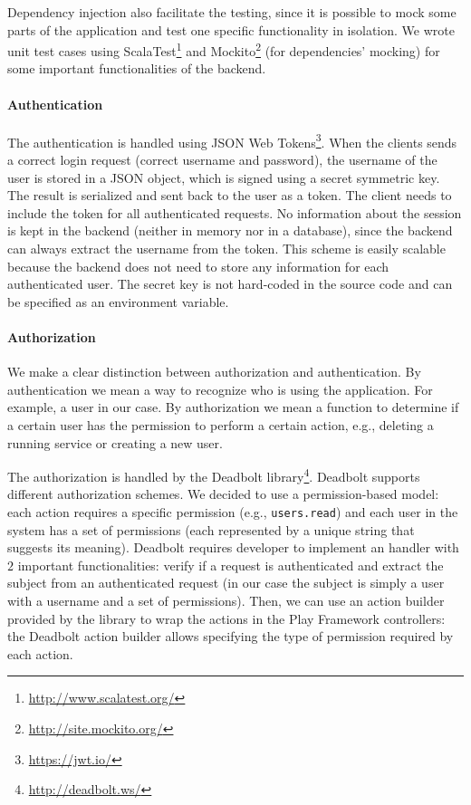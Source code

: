 Dependency injection also facilitate the testing, since it is possible to mock some parts of the application and test one specific functionality in isolation.
We wrote unit test cases using ScalaTest\footnote{\url{http://www.scalatest.org/}} and Mockito\footnote{\url{http://site.mockito.org/}} (for dependencies' mocking) for some important functionalities of the backend.

\paragraph{Authentication}
The authentication is handled using JSON Web Tokens\footnote{\url{https://jwt.io/}}.
When the clients sends a correct login request (correct username and password), the username of the user is stored in a JSON object, which is signed using a secret symmetric key.
The result is serialized and sent back to the user as a token.
The client needs to include the token for all authenticated requests.
No information about the session is kept in the backend (neither in memory nor in a database), since the backend can always extract the username from the token.
This scheme is easily scalable because the backend does not need to store any information for each authenticated user.
The secret key is not hard-coded in the source code and can be specified as an environment variable.

\paragraph{Authorization}
We make a clear distinction between authorization and authentication.
By authentication we mean a way to recognize who is using the application. For example, a user in our case.
By authorization we mean a function to determine if a certain user has the permission to perform a certain action, e.g., deleting a running service or creating a new user.

The authorization is handled by the Deadbolt library\footnote{\url{http://deadbolt.ws/}}.
Deadbolt supports different authorization schemes.
We decided to use a permission-based model:
each action requires a specific permission (e.g., \texttt{users.read}) and each user in the system has a set of permissions (each represented by a unique string that suggests its meaning).
Deadbolt requires developer to implement an handler with $2$ important functionalities:
verify if a request is authenticated and extract the subject from an authenticated request (in our case the subject is simply a user with a username and a set of permissions).
Then, we can use an action builder provided by the library to wrap the actions in the Play Framework controllers:
the Deadbolt action builder allows specifying the type of permission required by each action.

